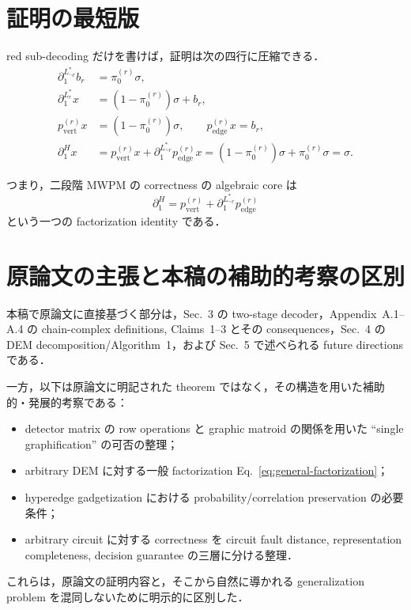 \documentclass[a4paper,11pt]{ltjsarticle}
\newcommand{\bd}{\partial}
\begin{document}
\section{証明の最短版}

red sub-decoding だけを書けば，証明は次の四行に圧縮できる．
\begin{align}
 \bd_1^{L^*_{\neg r}} b_r &= \pi_0^{(r)}\sigma,\\
 \bd_1^{L^*_r}x &= (1-\pi_0^{(r)})\sigma+b_r,\\
 p_{\mathrm{vert}}^{(r)}x&=(1-\pi_0^{(r)})\sigma,\qquad
 p_{\mathrm{edge}}^{(r)}x=b_r,\\
 \bd_1^H x
 &=p_{\mathrm{vert}}^{(r)}x+\bd_1^{L^*_{\neg r}}p_{\mathrm{edge}}^{(r)}x
 =(1-\pi_0^{(r)})\sigma+\pi_0^{(r)}\sigma=\sigma.
\end{align}

つまり，二段階 MWPM の correctness の algebraic core は
\begin{equation}
 \boxed{\bd_1^H=p_{\mathrm{vert}}^{(r)}+\bd_1^{L^*_{\neg r}}p_{\mathrm{edge}}^{(r)}}
\end{equation}
という一つの factorization identity である．

\section{原論文の主張と本稿の補助的考察の区別}

本稿で原論文に直接基づく部分は，Sec.~3 の two-stage decoder，Appendix~A.1--A.4 の chain-complex definitions, Claims~1--3 とその consequences，Sec.~4 の DEM decomposition/Algorithm~1，および Sec.~5 で述べられる future directions である．

一方，以下は原論文に明記された theorem ではなく，その構造を用いた補助的・発展的考察である：
\begin{itemize}
  \item detector matrix の row operations と graphic matroid の関係を用いた ``single graphification'' の可否の整理；
  \item arbitrary DEM に対する一般 factorization Eq.~\eqref{eq:general-factorization}；
  \item hyperedge gadgetization における probability/correlation preservation の必要条件；
  \item arbitrary circuit に対する correctness を circuit fault distance, representation completeness, decision guarantee の三層に分ける整理．
\end{itemize}
これらは，原論文の証明内容と，そこから自然に導かれる generalization problem を混同しないために明示的に区別した．
\end{document}
